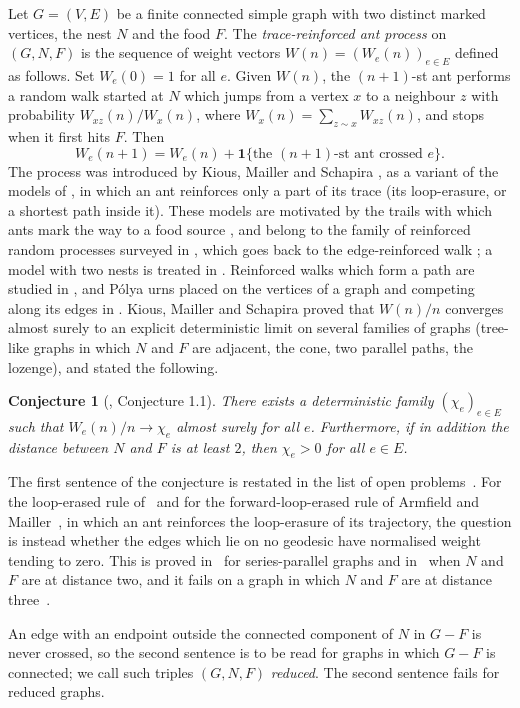 \documentclass[11pt]{amsart}
\newtheorem{conjecture}[theorem]{Conjecture}
\theoremstyle{remark}
\newcommand{\one}{\mathbf{1}}
\begin{document}
Let $G=(V,E)$ be a finite connected simple graph with two distinct marked vertices, the nest $N$ and the food $F$.
The \emph{trace-reinforced ant process} on $(G,N,F)$ is the sequence of weight vectors $W(n)=(W_e(n))_{e\in E}$
defined as follows. Set $W_e(0)=1$ for all $e$. Given $W(n)$, the $(n+1)$-st ant performs a random walk started at
$N$ which jumps from a vertex $x$ to a neighbour $z$ with probability $W_{xz}(n)/W_x(n)$, where
$W_x(n)=\sum_{z\sim x}W_{xz}(n)$, and stops when it first hits $F$. Then
\[
W_e(n+1)=W_e(n)+\one\{\text{the $(n+1)$-st ant crossed $e$}\}.
\]
The process was introduced by Kious, Mailler and Schapira \cite{KMS}, as a variant of the models of \cite{KMS0}, in
which an ant reinforces only a part of its trace (its loop-erasure, or a shortest path inside it). These models
are motivated by the trails with which ants mark the way to a food source \cite{Den,DS}, and belong to the family of
reinforced random processes surveyed in \cite{Pem07}, which goes back to the edge-reinforced walk \cite{Dav}; a model
with two nests is treated in \cite{MV}. Reinforced walks which form a path are studied in \cite{LGR,EFR}, and
P\'olya urns placed on the vertices of a graph and competing along its edges in \cite{HHKR}. Kious, Mailler
and Schapira proved that $W(n)/n$ converges almost surely to an explicit
deterministic limit on several families of graphs (tree-like graphs in which $N$ and $F$ are adjacent, the cone, two
parallel paths, the lozenge), and stated the following.

\begin{conjecture}[\cite{KMS}, Conjecture 1.1]\label{conj:kms}
There exists a deterministic family $(\chi_e)_{e\in E}$ such that $W_e(n)/n\to\chi_e$ almost surely for all $e$.
Furthermore, if in addition the distance between $N$ and $F$ is at least $2$, then $\chi_e>0$ for all $e\in E$.
\end{conjecture}

The first sentence of the conjecture is restated in the list of open problems~\cite[Section~2]{Aletti}. For the
loop-erased rule of~\cite{KMS0} and for the forward-loop-erased rule of Armfield and Mailler~\cite{AM}, in which an
ant reinforces the loop-erasure of its trajectory, the question is instead whether the edges which lie on no geodesic
have normalised weight tending to zero. This is proved in~\cite{KMS0} for series-parallel graphs and in~\cite{AM}
when $N$ and $F$ are at distance two, and it fails on a graph in which $N$ and $F$ are at distance
three~\cite{ShmaloLE}.

An edge with an endpoint outside the connected component of $N$ in $G-F$ is never crossed, so the second sentence is
to be read for graphs in which $G-F$ is connected; we call such triples $(G,N,F)$ \emph{reduced}. The second sentence
fails for reduced graphs.
\end{document}
